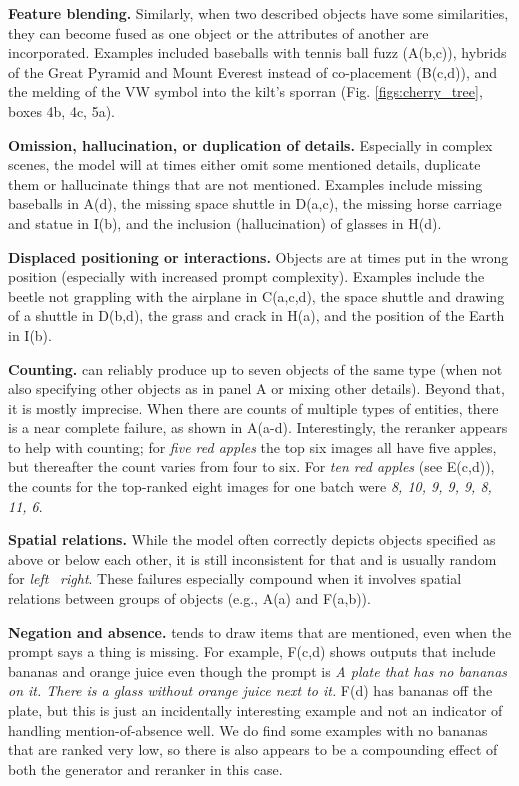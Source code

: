 \textbf{Feature blending.} Similarly, when two described objects have some similarities, they can become fused as one object or the attributes of another are incorporated. Examples included baseballs with tennis ball fuzz (A(b,c)), hybrids of the Great Pyramid and Mount Everest instead of co-placement (B(c,d)), and the melding of the VW symbol into the kilt's sporran (Fig. \ref{figs:cherry_tree}, boxes 4b, 4c, 5a).

\textbf{Omission, hallucination, or duplication of details.} Especially in complex scenes, the model will at times either omit some mentioned details, duplicate them or hallucinate things that are not mentioned. Examples include missing baseballs in A(d), the missing space shuttle in D(a,c), the missing horse carriage and statue in I(b), and the inclusion (hallucination) of glasses in H(d).

\textbf{Displaced positioning or interactions.} Objects are at times put in the wrong position (especially with increased prompt complexity). Examples include the beetle not grappling with the airplane in C(a,c,d), the space shuttle and drawing of a shuttle in D(b,d), the grass and crack in H(a), and the position of the Earth in I(b).

\textbf{Counting.} \bdraw can reliably produce up to seven objects of the same type (when not also specifying other objects as in panel A or mixing other details). Beyond that, it is mostly imprecise. When there are counts of multiple types of entities, there is a near complete failure, as shown in A(a-d). Interestingly, the reranker appears to help with counting; \eg for \textit{five red apples} the top six images all have five apples, but thereafter the count varies from four to six. For \textit{ten red apples} (see E(c,d)), the counts for the top-ranked eight images for one batch were \textit{8, 10, 9, 9, 9, 8, 11, 6}.

\textbf{Spatial relations.} While the model often correctly depicts objects specified as above or below each other, it is still inconsistent for that and is usually random for \textit{left} \vs\  \textit{right}. These failures especially compound when it involves spatial relations between groups of objects (e.g., A(a) and F(a,b)).

\textbf{Negation and absence.} \bdraw tends to draw items that are mentioned, even when the prompt says a thing is missing. For example, F(c,d) shows outputs that include bananas and orange juice even though the prompt is \textit{A plate that has no bananas on it. There is a glass without orange juice next to it.} F(d) has bananas off the plate, but this is just an incidentally interesting example and not an indicator of handling mention-of-absence well. We do find some examples with no bananas that are ranked very low, so there is also appears to be a compounding effect of both the generator and reranker in this case.

